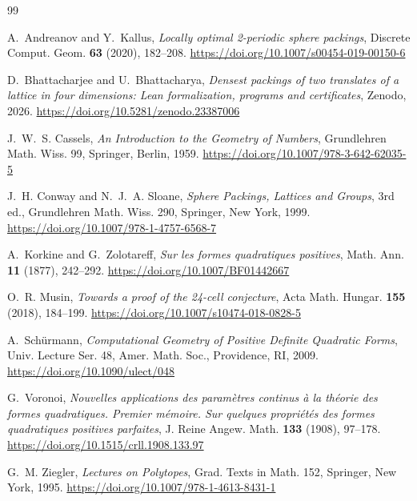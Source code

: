 \documentclass[11pt]{amsart}
\theoremstyle{definition}
\theoremstyle{remark}
\numberwithin{equation}{section}
\numberwithin{table}{section}
\numberwithin{figure}{section}
\providecommand{\doi}[1]{\url{https://doi.org/#1}}
\newcommand{\zenodoID}{10.5281/zenodo.23387006}
\begin{document}
{\raggedright
\begin{thebibliography}{99}

A.~Andreanov and Y.~Kallus, \emph{Locally optimal 2-periodic sphere packings}, Discrete Comput. Geom. \textbf{63} (2020), 182--208. \doi{10.1007/s00454-019-00150-6}

D.~Bhattacharjee and U.~Bhattacharya, \emph{Densest packings of two translates of a lattice in four dimensions: Lean formalization, programs and certificates}, Zenodo, 2026. \doi{\zenodoID}

J.~W.~S. Cassels, \emph{An Introduction to the Geometry of Numbers}, Grundlehren Math. Wiss. 99, Springer, Berlin, 1959. \doi{10.1007/978-3-642-62035-5}

J.~H. Conway and N.~J.~A. Sloane, \emph{Sphere Packings, Lattices and Groups}, 3rd ed., Grundlehren Math. Wiss. 290, Springer, New York, 1999. \doi{10.1007/978-1-4757-6568-7}

A.~Korkine and G.~Zolotareff, \emph{Sur les formes quadratiques positives}, Math. Ann. \textbf{11} (1877), 242--292. \doi{10.1007/BF01442667}

O.~R. Musin, \emph{Towards a proof of the 24-cell conjecture}, Acta Math. Hungar. \textbf{155} (2018), 184--199. \doi{10.1007/s10474-018-0828-5}

A.~Sch\"urmann, \emph{Computational Geometry of Positive Definite Quadratic Forms}, Univ. Lecture Ser. 48, Amer. Math. Soc., Providence, RI, 2009. \doi{10.1090/ulect/048}

G.~Voronoi, \emph{Nouvelles applications des param\`etres continus \`a la th\'eorie des formes quadratiques. Premier m\'emoire. Sur quelques propri\'et\'es des formes quadratiques positives parfaites}, J. Reine Angew. Math. \textbf{133} (1908), 97--178. \doi{10.1515/crll.1908.133.97}

G.~M. Ziegler, \emph{Lectures on Polytopes}, Grad. Texts in Math. 152, Springer, New York, 1995. \doi{10.1007/978-1-4613-8431-1}

\end{thebibliography}
}
\end{document}
